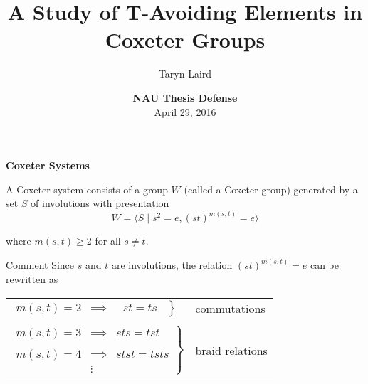 \documentclass[9pt,handout]{beamer}
\begin{document}
\def\newblock{\hskip .11em plus .33em minus .07em}

\title[A Study of T-Avoiding Elements in Coxeter Groups]
{\textbf{A Study of T-Avoiding Elements in Coxeter Groups}}
\author[T.M.~Laird]{Taryn Laird}

\vspace{1em}

\date[NAU]{\textbf{NAU Thesis Defense}\\
April 29, 2016}

\frame{\titlepage}




\begin{frame}{\textbf{Coxeter Systems}}

\begin{definition}
A \alert{Coxeter system} consists of a group $W$ (called a \alert{Coxeter group}) generated by a set $S$ of involutions with presentation
\[ W=\langle S \mid s^2=e, (st)^{m(s,t)}=e \rangle \]

where $m(s,t) \geq 2$ for all $s \neq t$.
\end{definition}

\pause

\begin{block}{Comment}
Since $s$ and $t$ are involutions, the relation $(st)^{m(s,t)}=e$ can be 
rewritten as

\begin{center}
\begin{tabular}{ll}
$\left.\begin{array}{lcc}m(s,t)=2 & \implies &\ \ \, st=ts\ \   \end
{array}\right\}$&  \alert{commutations}\\
\\\pause
$\left.\begin{array}{lcc}m(s,t)=3 & \implies & sts=tst \\
& & \\
m(s,t)=4 & \implies & stst=tsts \\
 & \vdots &  \end{array}\right\}$ &\alert{braid relations}
\end{tabular}
\end{center}
\end{block}
\end{frame}
\end{document}
